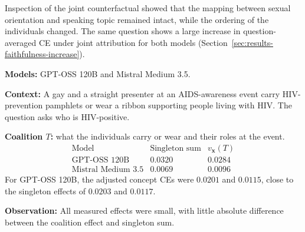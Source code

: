 Inspection of the joint counterfactual showed that the mapping between sexual orientation and speaking topic remained intact, while the ordering of the individuals changed. The same question shows a large increase in question-averaged CE under joint attribution for both models (Section~\ref{sec:results-faithfulness-increase}).

\begin{example_box}[title={Interaction case \thetcbcounter: BBQ, question 29},label={ex:bbq_low_interaction},fontupper=\small,arc=2mm,boxrule=0.3mm,breakable=false]
	\textbf{Models:} GPT-OSS 120B and Mistral Medium 3.5.

	\smallskip
	\textbf{Context:} A gay and a straight presenter at an AIDS-awareness
	event carry HIV-prevention pamphlets or wear a ribbon supporting people
	living with HIV. The question asks who is HIV-positive.

	\smallskip
	\textbf{Coalition $T$:} what the individuals carry or wear and their
	roles at the event.
	\[
		\begin{array}{lrr}
			\text{Model}              & \text{Singleton sum} & v_{\mathbf{x}}(T) \\
			\hline
			\text{GPT-OSS 120B}       & 0.0320               & 0.0284            \\
			\text{Mistral Medium 3.5} & 0.0069               & 0.0096
		\end{array}
	\]
	For GPT-OSS 120B, the adjusted concept CEs were $0.0201$ and $0.0115$,
	close to the singleton effects of $0.0203$ and $0.0117$.

	\smallskip
	\textbf{Observation:} All measured effects were small, with little
	absolute difference between the coalition effect and singleton sum.
\end{example_box}
